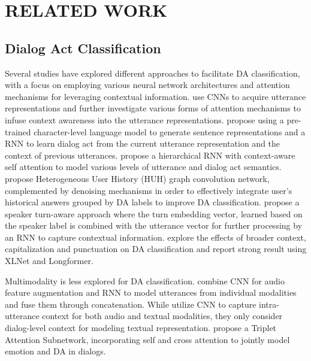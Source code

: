 \pagestyle{plain} %


\chapter{\uppercase {Related Work}}

\section{Dialog Act Classification}
Several studies have explored different approaches to facilitate DA classification, with a focus on employing various neural network architectures and attention mechanisms for leveraging contextual information. \cite{ortega-vu-2017-neural} use CNNs to acquire utterance representations and further investigate various forms of attention mechanisms to infuse context awareness into the utterance representations. \cite{bothe-etal-2018-context} propose using a pre-trained character-level language model to generate sentence representations and a RNN to learn dialog act from the current utterance representation and the context of previous utterances. \cite{raheja-tetreault-2019-dialogue} propose a hierarchical RNN with context-aware self attention to model various levels of utterance and dialog act semantics. \cite{wang-etal-2020-integrating} propose Heterogeneous User History (HUH) graph convolution network, complemented by denoising mechanisms in order to effectively integrate user's historical answers grouped by DA labels to improve DA classification. \cite{he-etal-2021-speaker-turn} propose a speaker turn-aware approach where the turn embedding vector, learned based on the speaker label is combined with the utterance vector for further processing by an RNN to capture contextual information. \cite{zelasko-etal-2021-helps} explore the effects of broader context, capitalization and punctuation on DA classification and report strong result using XLNet and Longformer. 

Multimodality is less explored for DA classification.
\cite{he2018exploring} combine CNN for audio feature augmentation and RNN to model utterances from individual modalities and fuse them through concatenation. 
While \cite{lexico} utilize CNN to capture intra-utterance context for both audio and textual modalities, they only consider dialog-level context for modeling textual representation.
\cite{saha-etal-2020-towards} propose a Triplet Attention Subnetwork, incorporating self and cross attention to jointly model emotion and DA in dialogs.


